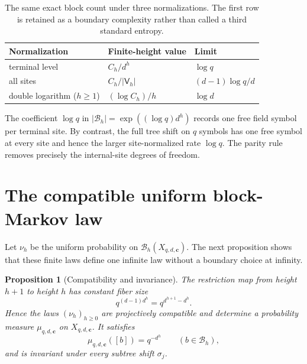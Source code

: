\documentclass[11pt,a4paper]{amsart}
\newtheorem{proposition}[theorem]{Proposition}
\theoremstyle{definition}
\theoremstyle{remark}
\newcommand{\cB}{\mathcal B}
\newcommand{\Vol}{\mathsf V}
\begin{document}
\begin{table}[t]
\centering
\caption{The same exact block count under three normalizations.  The first
row is retained as a boundary complexity rather than called a third standard
entropy.}
\label{tab:normalizations}
\begin{tabular}{@{}lll@{}}
\toprule
Normalization & Finite-height value & Limit \\
\midrule
terminal level & $C_h/d^h$ & $\log q$ \\
all sites & $C_h/|\Vol_h|$ & $(d-1)\log q/d$ \\
double logarithm ($h\geq1$) & $(\log C_h)/h$ & $\log d$ \\
\bottomrule
\end{tabular}
\end{table}

The coefficient $\log q$ in
$|\cB_h|=\exp((\log q)d^h)$ records one free field symbol per terminal site.
By contrast, the full tree shift on $q$ symbols has one free symbol at every
site and hence the larger site-normalized rate $\log q$.  The parity rule
removes precisely the internal-site degrees of freedom.

\section{The compatible uniform block-Markov law}
\label{sec:measure}

Let $\nu_h$ be the uniform probability on
$\cB_h(X_{q,d,\boldsymbol c})$.  The next proposition shows that these finite
laws define one infinite law without a boundary choice at infinity.

\begin{proposition}[Compatibility and invariance]\label{prop:compatible}
The restriction map from height $h+1$ to height $h$ has constant fiber size
\begin{equation}\label{eq:restriction-fiber}
 q^{(d-1)d^h}=q^{d^{h+1}-d^h}.
\end{equation}
Hence the laws $(\nu_h)_{h\geq0}$ are projectively compatible and determine
a probability measure $\mu_{q,d,\boldsymbol c}$ on
$X_{q,d,\boldsymbol c}$.  It satisfies
\begin{equation}\label{eq:uniform-cylinder}
 \mu_{q,d,\boldsymbol c}([b])=q^{-d^h}
 \qquad(b\in\cB_h),
\end{equation}
and is invariant under every subtree shift $\sigma_j$.
\end{proposition}
\end{document}
